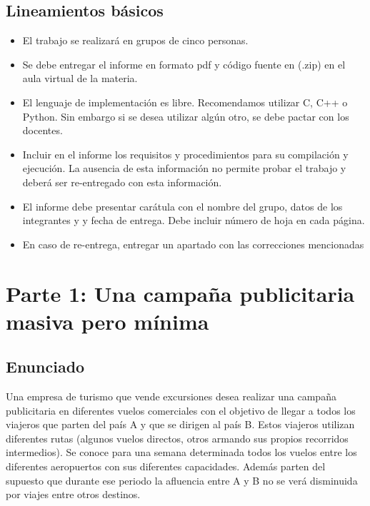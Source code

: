 \documentclass[titlepage,a4paper]{article}
\begin{document}
\subsection{Lineamientos básicos}
\begin{itemize}
    \item El trabajo se realizará en grupos de cinco personas.
    \item Se debe entregar el informe en formato pdf y código fuente en (.zip) en el aula virtual de la materia.
    \item El lenguaje de implementación es libre. Recomendamos utilizar C, C++ o Python.
        Sin embargo si se desea utilizar algún otro, se debe pactar con los docentes.
    \item Incluir en el informe los requisitos y procedimientos para su compilación y ejecución. La ausencia
        de esta información no permite probar el trabajo y deberá ser re-entregado con esta información.
    \item El informe debe presentar carátula con el nombre del grupo, datos de los
        integrantes y y fecha de entrega. Debe incluir número de hoja en cada página.
    \item En caso de re-entrega, entregar un apartado con las correcciones mencionadas
\end{itemize}




\setcounter{section}{0}%
\renewcommand{\thesection}{P\arabic{section}}%

\newpage\section{Parte 1: Una campaña publicitaria masiva pero mínima}\label{sec:parte1}

\setcounter{subsection}{0}%
\renewcommand{\thesubsection}{\alph{subsection}}%

\subsection{Enunciado}

Una empresa de turismo que vende excursiones desea realizar una campaña publicitaria en diferentes vuelos comerciales con el objetivo de llegar a todos los viajeros que parten del país A y que se dirigen al país B. Estos viajeros utilizan diferentes rutas (algunos vuelos directos, otros armando sus propios recorridos intermedios). Se conoce para una semana determinada todos los vuelos entre los diferentes aeropuertos con sus diferentes capacidades. Además parten del supuesto que durante ese periodo la afluencia entre A y B no se verá disminuida por viajes entre otros destinos.
\end{document}
